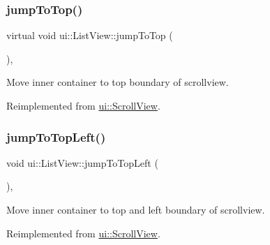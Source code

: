 \mbox{\label{classui_1_1ListView_ac816b897b329ca67365e8e3f31a5bf18}} 
\subsubsection{\texorpdfstring{jump\+To\+Top()}{jumpToTop()}\hspace{0.1cm}{\footnotesize\ttfamily [2/2]}}
{\footnotesize\ttfamily virtual void ui\+::\+List\+View\+::jump\+To\+Top (\begin{DoxyParamCaption}{ }\end{DoxyParamCaption})\hspace{0.3cm}{\ttfamily [override]}, {\ttfamily [virtual]}}

Move inner container to top boundary of scrollview. 

Reimplemented from \hyperlink{classui_1_1ScrollView_abdc304338a86f1fd0cea613fca25ffef}{ui\+::\+Scroll\+View}.

\mbox{\label{classui_1_1ListView_a18c1e20a9c26bffa2ff05156673d4ce9}} 
\subsubsection{\texorpdfstring{jump\+To\+Top\+Left()}{jumpToTopLeft()}\hspace{0.1cm}{\footnotesize\ttfamily [1/2]}}
{\footnotesize\ttfamily void ui\+::\+List\+View\+::jump\+To\+Top\+Left (\begin{DoxyParamCaption}{ }\end{DoxyParamCaption})\hspace{0.3cm}{\ttfamily [override]}, {\ttfamily [virtual]}}

Move inner container to top and left boundary of scrollview. 

Reimplemented from \hyperlink{classui_1_1ScrollView_ac61119b9f40bf3a81e3a71e3d84c0c90}{ui\+::\+Scroll\+View}.

\mbox{\label{classui_1_1ListView_a16fed680b5ef2a65ae0e3a1540e9727e}} 
